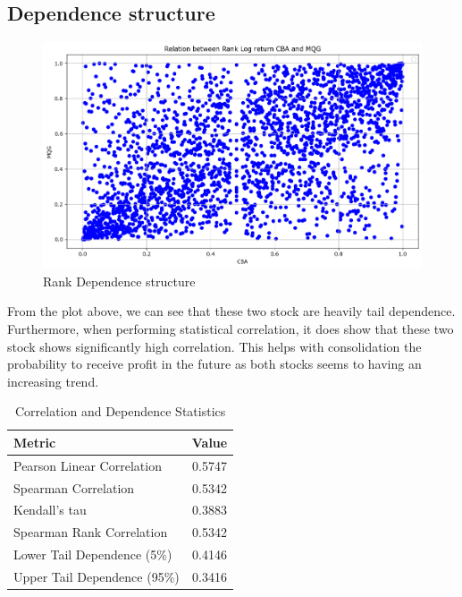 \subsection{Dependence structure}
\begin{figure}[H]
    \centering
    \includegraphics[width=1\linewidth]{image/dependence_structure.png}
    \caption{Rank Dependence structure}
    \label{fig:Rank Dependence structure}
\end{figure}
From the plot above, we can see that these two stock are heavily tail dependence. Furthermore, when performing statistical correlation, it does show that these two stock shows significantly high correlation. This helps with consolidation the probability to receive profit in the future as both stocks seems to having an increasing trend.
\begin{table}[H]
    \centering
    \begin{tabular}{@{} l c @{}}
        \toprule
        \textbf{Metric} & \textbf{Value} \\
        \midrule
        Pearson Linear Correlation & 0.5747 \\
        Spearman Correlation & 0.5342 \\
        Kendall's tau & 0.3883 \\
        Spearman Rank Correlation & 0.5342 \\
        Lower Tail Dependence (5\%) & 0.4146 \\
        Upper Tail Dependence (95\%) & 0.3416 \\
        \bottomrule
    \end{tabular}
    \caption{Correlation and Dependence Statistics}
    \label{tab:correlation_dependence}
\end{table}
